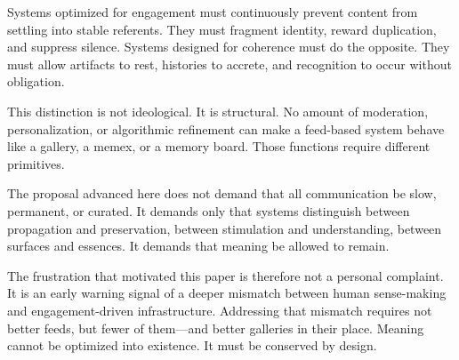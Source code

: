 \documentclass[11pt,oneside]{article}
\begin{document}
Systems optimized for engagement must continuously prevent content from settling into stable referents. They must fragment identity, reward duplication, and suppress silence. Systems designed for coherence must do the opposite. They must allow artifacts to rest, histories to accrete, and recognition to occur without obligation.

This distinction is not ideological. It is structural. No amount of moderation, personalization, or algorithmic refinement can make a feed-based system behave like a gallery, a memex, or a memory board. Those functions require different primitives.

The proposal advanced here does not demand that all communication be slow, permanent, or curated. It demands only that systems distinguish between propagation and preservation, between stimulation and understanding, between surfaces and essences. It demands that meaning be allowed to remain.

The frustration that motivated this paper is therefore not a personal complaint. It is an early warning signal of a deeper mismatch between human sense-making and engagement-driven infrastructure. Addressing that mismatch requires not better feeds, but fewer of them—and better galleries in their place. Meaning cannot be optimized into existence. It must be conserved by design.
\end{document}
